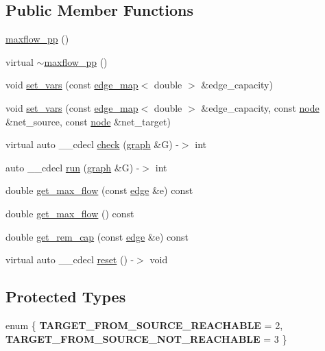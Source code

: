 \subsection*{Public Member Functions}
\begin{DoxyCompactItemize}
\item 
\mbox{\hyperlink{classmaxflow__pp_a29ec393f72f3289c49a79b0da17e3ccd}{maxflow\+\_\+pp}} ()
\item 
virtual \mbox{\hyperlink{classmaxflow__pp_a2f96bfeea4cb2c044d155d356d72452a}{$\sim$maxflow\+\_\+pp}} ()
\item 
void \mbox{\hyperlink{classmaxflow__pp_ac77f4c613efe7857e053f9bfb103dc3e}{set\+\_\+vars}} (const \mbox{\hyperlink{classedge__map}{edge\+\_\+map}}$<$ double $>$ \&edge\+\_\+capacity)
\item 
void \mbox{\hyperlink{classmaxflow__pp_a13756f76387cc114b88a44e324fc93ae}{set\+\_\+vars}} (const \mbox{\hyperlink{classedge__map}{edge\+\_\+map}}$<$ double $>$ \&edge\+\_\+capacity, const \mbox{\hyperlink{classnode}{node}} \&net\+\_\+source, const \mbox{\hyperlink{classnode}{node}} \&net\+\_\+target)
\item 
virtual auto \+\_\+\+\_\+cdecl \mbox{\hyperlink{classmaxflow__pp_a1535468f547b80ea750432f5e27c338d}{check}} (\mbox{\hyperlink{classgraph}{graph}} \&G) -\/$>$ int
\item 
auto \+\_\+\+\_\+cdecl \mbox{\hyperlink{classmaxflow__pp_a6c6fa792d7f0441048361778697e8e1e}{run}} (\mbox{\hyperlink{classgraph}{graph}} \&G) -\/$>$ int
\item 
double \mbox{\hyperlink{classmaxflow__pp_ac561a61619f363ef5d9b8fc5cfb10a5f}{get\+\_\+max\+\_\+flow}} (const \mbox{\hyperlink{classedge}{edge}} \&e) const
\item 
double \mbox{\hyperlink{classmaxflow__pp_a72210f8ac7aeca0a58e7407681003083}{get\+\_\+max\+\_\+flow}} () const
\item 
double \mbox{\hyperlink{classmaxflow__pp_ab3af0c0568ff2c8295166bfd75736169}{get\+\_\+rem\+\_\+cap}} (const \mbox{\hyperlink{classedge}{edge}} \&e) const
\item 
virtual auto \+\_\+\+\_\+cdecl \mbox{\hyperlink{classmaxflow__pp_a479e6e218f81d20acdc706b5771e38cb}{reset}} () -\/$>$ void
\end{DoxyCompactItemize}
\subsection*{Protected Types}
\begin{DoxyCompactItemize}
\item 
\mbox{\label{classmaxflow__pp_abd042f1baa6a6200b5bbed755f400d2d}} 
enum \{ {\bfseries T\+A\+R\+G\+E\+T\+\_\+\+F\+R\+O\+M\+\_\+\+S\+O\+U\+R\+C\+E\+\_\+\+R\+E\+A\+C\+H\+A\+B\+LE} = 2, 
{\bfseries T\+A\+R\+G\+E\+T\+\_\+\+F\+R\+O\+M\+\_\+\+S\+O\+U\+R\+C\+E\+\_\+\+N\+O\+T\+\_\+\+R\+E\+A\+C\+H\+A\+B\+LE} = 3
 \}
\end{DoxyCompactItemize}
